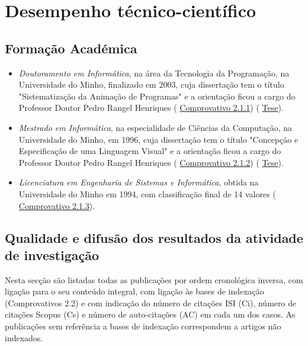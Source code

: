 \documentclass[11pt]{article}
\newcommand{
\daterange}[1]{#1}
\begin{document}
\section{Desempenho técnico-científico}
\subsection{Formação Académica} 
\begin{itemize} 
\item{{
\em{{Doutoramento em Informática}}}, na área da Tecnologia da Programação, na Universidade do Minho, finalizado em 
\daterange{2003}, cuja dissertação tem o título "Sistematização da Animação de Programas" e a orientação ficou a cargo do Professor Doutor Pedro Rangel Henriques (
\href{run:Diplomas/dout.pdf}{Comprovativo 2.1.1}) (
\href{run:Publicacoes/publicacoes/8.pdf}{Tese}).}
\item{{
\em{{Mestrado em Informática}}}, na especialidade de Ciências da Computação, na Universidade do Minho, em 
\daterange{1996}, cuja dissertação tem o título "Concepção e Especificação de uma Linguagem Visual" e a orientação ficou a cargo do Professor Doutor Pedro Rangel Henriques (
\href{run:Diplomas/mest.pdf}{Comprovativo 2.1.2}) (
\href{run:Publicacoes/publicacoes/1.pdf}{Tese}).}
\item{{
\em{{Licenciatura em Engenharia de Sistemas e Informática}}}, obtida na Universidade do Minho em 
\daterange{1994}, com classificação final de 14 valores (
\href{run:Diplomas/licenc.pdf}{Comprovativo 2.1.3}).}
\end{itemize}
\subsection{Qualidade e difusão dos resultados da atividade de investigação}Nesta secção são listadas todas as publicações por ordem cronológica inversa, com ligação para o seu conteúdo integral, com ligação às bases de indexação (Comprovativos 2.2) e com indicação do número de citações ISI (Ci), número de citações Scopus (Cs) e número de auto-citações (AC) em cada um dos casos. As publicações sem referência a bases de indexação correspondem a artigos não indexados.
\end{document}
